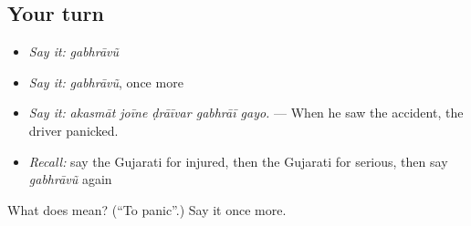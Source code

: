 \subsection*{Your turn}
\begin{itemize}
\raggedright
  \item \emph{Say it:} \emph{gabhrāvũ}
  \item \emph{Say it:} \emph{gabhrāvũ}, once more
  \item \emph{Say it:} \emph{akasmāt joīne ḍrāīvar gabhrāī gayo.} — When he saw the accident, the driver panicked.
  \item \emph{Recall:} say the Gujarati for injured, then the Gujarati for serious, then say \emph{gabhrāvũ} again
\end{itemize}

\begin{tcolorbox}[breakable,colback=teal!4,colframe=teal!35!black,title={Before you move on}]
What does  mean? (\textquotedblleft{}To panic\textquotedblright{}.) Say it once more.
\end{tcolorbox}
